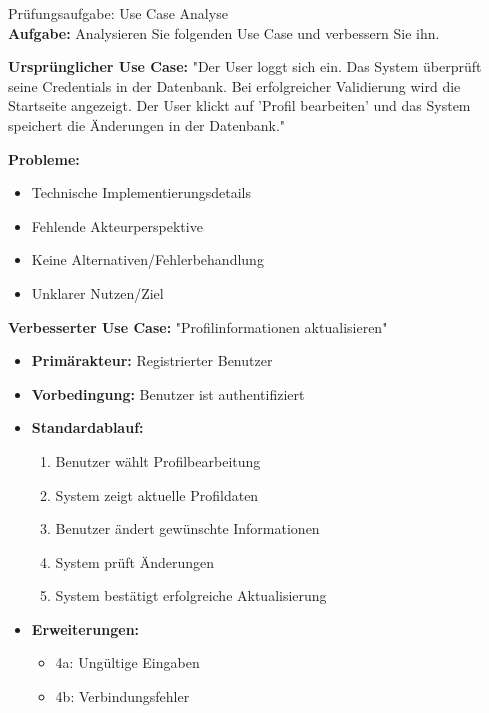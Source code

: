 \begin{example2}{Prüfungsaufgabe: Use Case Analyse}\\
\textbf{Aufgabe:} Analysieren Sie folgenden Use Case und verbessern Sie ihn.

\textbf{Ursprünglicher Use Case:}
"Der User loggt sich ein. Das System überprüft seine Credentials in der Datenbank. 
Bei erfolgreicher Validierung wird die Startseite angezeigt. Der User klickt auf 'Profil bearbeiten' 
und das System speichert die Änderungen in der Datenbank."

\textbf{Probleme:}
\begin{itemize}
    \item Technische Implementierungsdetails
    \item Fehlende Akteurperspektive
    \item Keine Alternativen/Fehlerbehandlung
    \item Unklarer Nutzen/Ziel
\end{itemize}

\textbf{Verbesserter Use Case:}
"Profilinformationen aktualisieren"
\begin{itemize}
    \item \textbf{Primärakteur:} Registrierter Benutzer
    \item \textbf{Vorbedingung:} Benutzer ist authentifiziert
    \item \textbf{Standardablauf:}
    \begin{enumerate}
        \item Benutzer wählt Profilbearbeitung
        \item System zeigt aktuelle Profildaten
        \item Benutzer ändert gewünschte Informationen
        \item System prüft Änderungen
        \item System bestätigt erfolgreiche Aktualisierung
    \end{enumerate}
    \item \textbf{Erweiterungen:}
    \begin{itemize}
        \item 4a: Ungültige Eingaben
        \item 4b: Verbindungsfehler
    \end{itemize}
\end{itemize}
\end{example2}



\columnbreak

